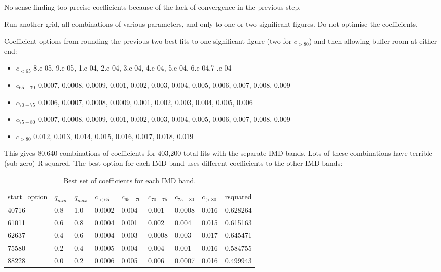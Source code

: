 \documentclass[12pt]{extarticle}
\begin{document}
No sense finding too precise coefficients because of the lack of convergence in the previous step.

Run another grid, all combinations of various parameters, and only to one or two significant figures. Do not optimise the coefficients.

Coefficient options from rounding the previous two best fits to one significant figure (two for $c_{>80}$) and then allowing buffer room at either end:
\begin{itemize}
    \item $c_{<65}$ 8.e-05, 9.e-05, 1.e-04, 2.e-04, 3.e-04, 4.e-04, 5.e-04, 6.e-04,7 .e-04
    \item $c_{65-70}$ 0.0007, 0.0008, 0.0009, 0.001, 0.002, 0.003, 0.004, 0.005, 0.006, 0.007, 0.008, 0.009
    \item $c_{70-75}$ 0.0006, 0.0007, 0.0008, 0.0009, 0.001, 0.002, 0.003, 0.004, 0.005, 0.006
    \item $c_{75-80}$ 0.0007, 0.0008, 0.0009, 0.001, 0.002, 0.003, 0.004, 0.005, 0.006, 0.007, 0.008, 0.009
    \item $c_{>80}$ 0.012, 0.013, 0.014, 0.015, 0.016, 0.017, 0.018, 0.019
\end{itemize}

This gives 80,640 combinations of coefficients for 403,200 total fits with the separate IMD bands. Lots of these combinations have terrible (sub-zero) R-squared. The best option for each IMD band uses different coefficients to the other IMD bands:

\begin{table}[h]
\centering

\begin{tabular}{l l l l l l l l l}
start\_option & $q_{min}$ & $q_{max}$ & $c_{<65}$ & $c_{65-70}$ & $c_{70-75}$ & $c_{75-80}$ & $c_{>80}$ & rsquared \\

40716 & 0.8 & 1.0 & 0.0002 & 0.004 & 0.001 & 0.0008 & 0.016 & 0.628264 \\
61011 & 0.6 & 0.8 & 0.0004 & 0.001 & 0.002 & 0.004 & 0.015 & 0.615163 \\
62637 & 0.4 & 0.6 & 0.0004 & 0.003 & 0.0008 & 0.003 & 0.017 & 0.645471 \\
75580 & 0.2 & 0.4 & 0.0005 & 0.004 & 0.004 & 0.001 & 0.016 & 0.584755 \\
88228 & 0.0 & 0.2 & 0.0006 & 0.005 & 0.006 & 0.0007 & 0.016 & 0.499943 \\
\end{tabular}
    \caption{Best set of coefficients for each IMD band.}
    \label{tab:best_coeffs}
\end{table}
\end{document}
